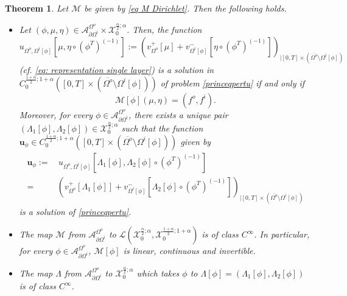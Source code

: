 \documentclass[10pt,a4paper]{amsart}
\newtheorem{theorem}{Theorem}
\begin{document}
\begin{theorem}\label{sec 5: thm recall dir}
Let $\mathcal{M}$ be given by \eqref{eq M Dirichlet}. Then the following holds.
\begin{itemize}
    \item[(i)] Let $(\phi,\mu, \eta) \in \mathcal{A}^{\Omega^o}_{\partial\Omega^i} \times \mathcal{X}_0^{\frac{\alpha}{2}; \alpha}$. Then, the function 
    \[
    u_{\Omega^o,\Omega^i[\phi]}\left[\mu,\eta\circ (\phi^T)^{(-1)}\right] := \left( v^+_{\Omega^o} [\mu] + v^-_{\Omega^i[\phi]} \left[\eta\circ (\phi^T)^{(-1)}\right] \right)_{| [0,T] \times (\overline{\Omega^o} \setminus {\Omega^i[\phi]})} 
    \]
    (cf. \eqref{eq: representation single layer}) is a solution in $C_{0}^{\frac{1+\alpha}{2}; 1+\alpha}([0,T] \times (\overline{\Omega^o} \setminus \Omega^i[\phi]))$ of problem \eqref{princeqpertu} if and only if 
    \begin{equation*}
    \mathcal{M}[\phi](\mu, \eta) = (f^o,f^i).
    \end{equation*}
    Moreover, for every $\phi \in \mathcal{A}^{\Omega^o}_{\partial\Omega^i}$, there exists a unique pair $(\Lambda_1[\phi],\Lambda_2[\phi]) \in \mathcal{X}_0^{\frac{\alpha}{2}; \alpha}$ such that 
    the function $\mathbf{u}_\phi \in C_{0}^{\frac{1+\alpha}{2}; 1+\alpha}([0,T] \times (\overline{\Omega^o} \setminus \Omega^i[\phi] ))$ given by
    \begin{equation*}
    \begin{split}
        \mathbf{u}_{\phi} :=& \,u_{\Omega^o,\Omega^i[\phi]}\left[\Lambda_1[\phi],\Lambda_2[\phi]\circ (\phi^T)^{(-1)}\right] 
        \\
        =&\left( v^+_{\Omega^o} [\Lambda_1[\phi]] + v^-_{\Omega^i[\phi]}
        \left[\Lambda_2[\phi]\circ (\phi^T)^{(-1)}\right] \right)_{| [0,T] \times (\overline{\Omega^o} \setminus {\Omega^i[\phi]})}
    \end{split}
    \end{equation*}
    is a solution of \eqref{princeqpertu}.

    \item[(ii)] The map $\mathcal{M}$ from $\mathcal{A}^{\Omega^o}_{\partial\Omega^i}$ to $\mathcal{L} \left( \mathcal{X}_0^{\frac{\alpha}{2}; \alpha}, \mathcal{X}_0^{\frac{1+\alpha}{2}; 1+\alpha} \right)$ is of class $C^{\infty}$. In particular, for every $\phi \in \mathcal{A}^{\Omega^o}_{\partial\Omega^i}$, $\mathcal{M}[\phi]$ is linear, continuous and invertible.

    \item[(iii)] The map $\Lambda$ from $\mathcal{A}^{\Omega^o}_{\partial\Omega^i}$ to $\mathcal{X}_0^{\frac{\alpha}{2}; \alpha}$ which takes $\phi$ to $\Lambda[\phi] = (\Lambda_1[\phi],\Lambda_2[\phi])$ is of class $C^{\infty}$.
    \end{itemize}
\end{theorem}
\end{document}
